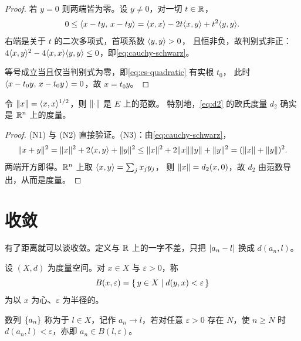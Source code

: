 \begin{proof}
  若 \(y = 0\) 则两端皆为零。设 \(y \neq 0\)，对一切 \(t \in \mathbb{R}\)，
  \begin{equation}
    \label{eq:cs-quadratic}
    0 \le \langle x-ty,\, x-ty\rangle = \langle x,x\rangle - 2t\langle x,y\rangle + t^{2}\langle y,y\rangle.
  \end{equation}
  右端是关于 \(t\) 的二次多项式，首项系数 \(\langle y,y\rangle > 0\)，
  且恒非负，故判别式非正：
  \(4\langle x,y\rangle^{2} - 4\langle x,x\rangle\langle y,y\rangle \le 0\)，即\cref{eq:cauchy-schwarz}。

  等号成立当且仅当判别式为零，即\cref{eq:cs-quadratic} 有实根 \(t_{0}\)，
  此时 \(\langle x-t_{0}y,\,x-t_{0}y\,\rangle = 0\)，故 \(x = t_{0}y\)。
\end{proof}

\begin{corollary}
  \label{cor:inner-gives-norm}
  令 \(\lVert x\rVert = \langle x,x\rangle^{1/2}\)，则 \(\lVert\cdot\rVert\) 是 \(E\) 上的范数。
  特别地，\cref{eq:d2} 的欧氏度量 \(d_{2}\) 确实是 \(\mathbb{R}^{n}\) 上的度量。
\end{corollary}

\begin{proof}
  (N1) 与 (N2) 直接验证。(N3)：由\cref{eq:cauchy-schwarz}，
  \begin{equation}
    \label{eq:triangle-from-cs}
    \lVert x+y\rVert^{2} = \lVert x\rVert^{2} + 2\langle x,y\rangle + \lVert y\rVert^{2}
      \le \lVert x\rVert^{2} + 2\lVert x\rVert\lVert y\rVert + \lVert y\rVert^{2} = (\lVert x\rVert+\lVert y\rVert)^{2}.
  \end{equation}
  两端开方即得。\(\mathbb{R}^{n}\) 上取 \(\langle x,y\rangle = \sum_{j} x_{j}y_{j}\)，
  则 \(\lVert x\rVert = d_{2}(x,0)\)，故 \(d_{2}\) 由范数导出，从而是度量。
\end{proof}

\section{收敛}
\label{sec:convergence}

有了距离就可以谈收敛。定义与 \(\mathbb{R}\) 上的一字不差，只把 \(\lvert a_{n}-l\rvert\)
换成 \(d(a_{n},l)\)。

\begin{definition}[收敛与开球]
  \label{def:convergence}
  设 \((X,d)\) 为度量空间。对 \(x \in X\) 与 \(\varepsilon > 0\)，称
  \begin{equation}
    \label{eq:open-ball}
    B(x,\varepsilon) = \left\{\,y \in X \;\middle|\; d(y,x) < \varepsilon\,\right\}
  \end{equation}
  为以 \(x\) 为心、\(\varepsilon\) 为半径的。

  数列 \(\{a_{n}\}\) 称为于 \(l \in X\)，记作
  \(a_{n} \to l\)，若对任意 \(\varepsilon > 0\) 存在 \(N\)，使 \(n \ge N\) 时
  \(d(a_{n}, l) < \varepsilon\)，亦即 \(a_{n} \in B(l,\varepsilon)\)。
\end{definition}

